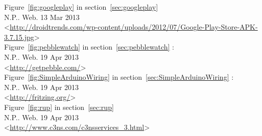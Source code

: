 \begin{thebibliography}{21}
	Figure~\ref{fig:googleplay} in section~\ref{sec:googleplay} \\
	N.P.. Web. 13 Mar 2013\\
	<\url{http://droidtrends.com/wp-content/uploads/2012/07/Google-Play-Store-APK-3.7.15.jpg}> \\

	Figure~\ref{fig:pebblewatch} in section~\ref{sec:pebblewatch} : \\
	N.P.. Web. 19 Apr 2013\\
	<\url{http://getpebble.com/}> \\

	Figure~\ref{fig:SimpleArduinoWiring} in section~\ref{sec:SimpleArduinoWiring} : \\
	N.P.. Web. 19 Apr 2013\\
	<\url{http://fritzing.org/}> \\

	Figure~\ref{fig:rup} in section~\ref{sec:rup} \\
	N.P.. Web. 19 Apr 2013\\
	<\url{http://www.c3ns.com/c3nsservices_3.html}> \\
	
\end{thebibliography}
